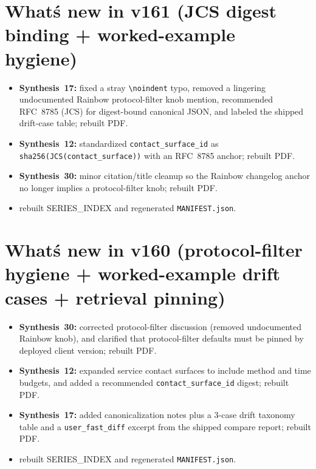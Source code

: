 \documentclass[11pt]{article}
\begin{document}
\section{What\'s new in v161 (JCS digest binding + worked-example hygiene)}
\begin{itemize}[leftmargin=*]
\item \textbf{Synthesis~17:} fixed a stray \texttt{\textbackslash noindent} typo, removed a lingering undocumented Rainbow protocol-filter knob mention, recommended RFC~8785 (JCS) for digest-bound canonical JSON, and labeled the shipped drift-case table; rebuilt PDF.
\item \textbf{Synthesis~12:} standardized \texttt{contact\_surface\_id} as \texttt{sha256(JCS(contact\_surface))} with an RFC~8785 anchor; rebuilt PDF.
\item \textbf{Synthesis~30:} minor citation/title cleanup so the Rainbow changelog anchor no longer implies a protocol-filter knob; rebuilt PDF.
\item rebuilt SERIES\_INDEX and regenerated \texttt{MANIFEST.json}.
\end{itemize}

\section{What\'s new in v160 (protocol-filter hygiene + worked-example drift cases + retrieval pinning)}
\begin{itemize}[leftmargin=*]
\item \textbf{Synthesis~30:} corrected protocol-filter discussion (removed undocumented Rainbow knob), and clarified that protocol-filter defaults must be pinned by deployed client version; rebuilt PDF.
\item \textbf{Synthesis~12:} expanded service contact surfaces to include method and time budgets, and added a recommended \texttt{contact\_surface\_id} digest; rebuilt PDF.
\item \textbf{Synthesis~17:} added canonicalization notes plus a 3-case drift taxonomy table and a \texttt{user\_fast\_diff} excerpt from the shipped compare report; rebuilt PDF.
\item rebuilt SERIES\_INDEX and regenerated \texttt{MANIFEST.json}.
\end{itemize}
\end{document}
